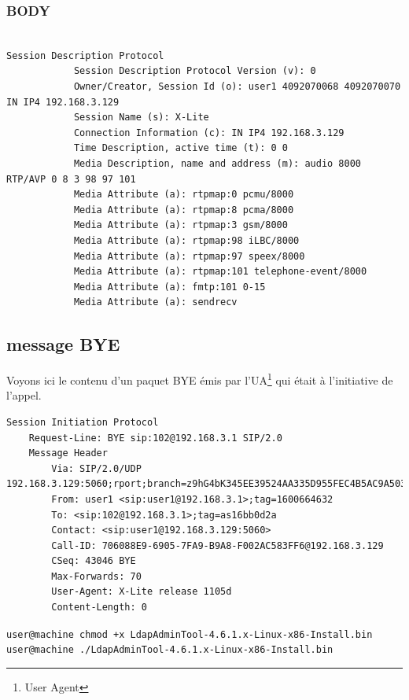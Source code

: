 \documentclass[12pt,a4paper,notitlepage]{article}
\begin{document}
\subsubsection{BODY}
\begin{lstlisting}[title=Contenu du BODY d'un paquet INVITE de SIP]

Session Description Protocol
            Session Description Protocol Version (v): 0
            Owner/Creator, Session Id (o): user1 4092070068 4092070070 IN IP4 192.168.3.129
            Session Name (s): X-Lite
            Connection Information (c): IN IP4 192.168.3.129
            Time Description, active time (t): 0 0
            Media Description, name and address (m): audio 8000 RTP/AVP 0 8 3 98 97 101
            Media Attribute (a): rtpmap:0 pcmu/8000
            Media Attribute (a): rtpmap:8 pcma/8000
            Media Attribute (a): rtpmap:3 gsm/8000
            Media Attribute (a): rtpmap:98 iLBC/8000
            Media Attribute (a): rtpmap:97 speex/8000
            Media Attribute (a): rtpmap:101 telephone-event/8000
            Media Attribute (a): fmtp:101 0-15
            Media Attribute (a): sendrecv
\end{lstlisting}

\subsection{message BYE} 
Voyons ici le contenu d'un paquet BYE émis par l'UA\footnote{User Agent} qui était à l'initiative de l'appel.

\begin{lstlisting}[title=Contenu d'un paquet BYE]
Session Initiation Protocol
    Request-Line: BYE sip:102@192.168.3.1 SIP/2.0
    Message Header
        Via: SIP/2.0/UDP 192.168.3.129:5060;rport;branch=z9hG4bK345EE39524AA335D955FEC4B5AC9A503
        From: user1 <sip:user1@192.168.3.1>;tag=1600664632
        To: <sip:102@192.168.3.1>;tag=as16bb0d2a
        Contact: <sip:user1@192.168.3.129:5060>
        Call-ID: 706088E9-6905-7FA9-B9A8-F002AC583FF6@192.168.3.129
        CSeq: 43046 BYE
        Max-Forwards: 70
        User-Agent: X-Lite release 1105d
        Content-Length: 0
\end{lstlisting}

\noindent \texttt{user@machine  chmod +x LdapAdminTool-4.6.1.x-Linux-x86-Install.bin \\
user@machine  ./LdapAdminTool-4.6.1.x-Linux-x86-Install.bin}
\bigskip
\end{document}
